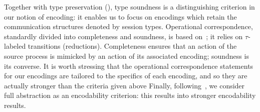\smallskip 

\noi Together with type preservation (), type soundness is a distinguishing criterion in our notion of encoding: it enables us to focus on encodings which retain the communication structures denoted by session types.
Operational correspondence, standardly divided into completeness and soundness, is based
on~\cite{DBLP:journals/iandc/Gorla10,DBLP:conf/icalp/LanesePSS10};
it relies on 
$\tau$-labeled transitions (reductions).
Completeness ensures that an action of the source process is mimicked
by an action of its associated encoding; soundness is its converse.
It is worth stressing that 
the operational correspondence statements 
for our encodings 
 are tailored to the specifics of each encoding, and so they
 are actually stronger than the criteria given above
Finally, following~\cite{SangiorgiD:expmpa,DBLP:conf/lics/PalamidessiSVV06,Yoshida96},
we consider full abstraction as an encodability criterion: this results into 
stronger encodability results. 

%

